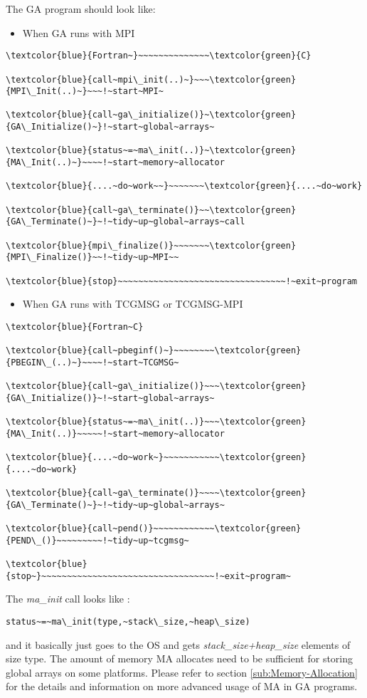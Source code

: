 The GA program should look like:
\begin{itemize}
\item When GA runs with MPI\end{itemize}
\begin{verbatim}
\textcolor{blue}{Fortran~}~~~~~~~~~~~~~~\textcolor{green}{C}

\textcolor{blue}{call~mpi\_init(..)~}~~~\textcolor{green}{MPI\_Init(..)~}~~~!~start~MPI~

\textcolor{blue}{call~ga\_initialize()}~\textcolor{green}{GA\_Initialize()~}!~start~global~arrays~

\textcolor{blue}{status~=~ma\_init(..)}~\textcolor{green}{MA\_Init(..)~}~~~~!~start~memory~allocator

\textcolor{blue}{....~do~work~~}~~~~~~~\textcolor{green}{....~do~work}

\textcolor{blue}{call~ga\_terminate()}~~\textcolor{green}{GA\_Terminate()~}~!~tidy~up~global~arrays~call

\textcolor{blue}{mpi\_finalize()}~~~~~~~\textcolor{green}{MPI\_Finalize()}~~!~tidy~up~MPI~~

\textcolor{blue}{stop}~~~~~~~~~~~~~~~~~~~~~~~~~~~~~~~~~!~exit~program\end{verbatim}
\begin{itemize}
\item When GA runs with TCGMSG or TCGMSG-MPI\end{itemize}
\begin{verbatim}
\textcolor{blue}{Fortran~C}

\textcolor{blue}{call~pbeginf()~}~~~~~~~~\textcolor{green}{PBEGIN\_(..)~}~~~~!~start~TCGMSG~

\textcolor{blue}{call~ga\_initialize()}~~~\textcolor{green}{GA\_Initialize()}~!~start~global~arrays~

\textcolor{blue}{status~=~ma\_init(..)}~~~\textcolor{green}{MA\_Init(..)}~~~~~!~start~memory~allocator

\textcolor{blue}{....~do~work~}~~~~~~~~~~~\textcolor{green}{....~do~work}

\textcolor{blue}{call~ga\_terminate()}~~~~\textcolor{green}{GA\_Terminate()~}~!~tidy~up~global~arrays~

\textcolor{blue}{call~pend()}~~~~~~~~~~~~\textcolor{green}{PEND\_()}~~~~~~~~~!~tidy~up~tcgmsg~

\textcolor{blue}{stop~}~~~~~~~~~~~~~~~~~~~~~~~~~~~~~~~~~~!~exit~program~
\end{verbatim}
The \emph{ma\_init }call looks like :
\begin{verbatim}
status~=~ma\_init(type,~stack\_size,~heap\_size)
\end{verbatim}
and it basically just goes to the OS and gets \emph{stack\_size+heap\_size}
elements of size type. The amount of memory MA allocates need to be
sufficient for storing global arrays on some platforms. Please refer
to section \ref{sub:Memory-Allocation} for the details and information
on more advanced usage of MA in GA programs. 



